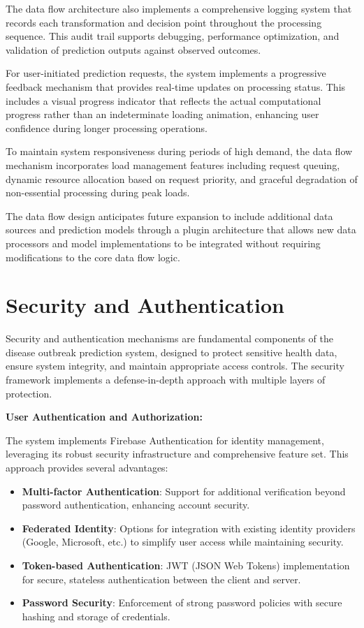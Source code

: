\documentclass[12pt,a4paper]{report}
\begin{document}
The data flow architecture also implements a comprehensive logging system that records each transformation and decision point throughout the processing sequence. This audit trail supports debugging, performance optimization, and validation of prediction outputs against observed outcomes.

For user-initiated prediction requests, the system implements a progressive feedback mechanism that provides real-time updates on processing status. This includes a visual progress indicator that reflects the actual computational progress rather than an indeterminate loading animation, enhancing user confidence during longer processing operations.

To maintain system responsiveness during periods of high demand, the data flow mechanism incorporates load management features including request queuing, dynamic resource allocation based on request priority, and graceful degradation of non-essential processing during peak loads.

The data flow design anticipates future expansion to include additional data sources and prediction models through a plugin architecture that allows new data processors and model implementations to be integrated without requiring modifications to the core data flow logic.

\section{Security and Authentication}
Security and authentication mechanisms are fundamental components of the disease outbreak prediction system, designed to protect sensitive health data, ensure system integrity, and maintain appropriate access controls. The security framework implements a defense-in-depth approach with multiple layers of protection.

\textbf{User Authentication and Authorization:}

The system implements Firebase Authentication for identity management, leveraging its robust security infrastructure and comprehensive feature set. This approach provides several advantages:

\begin{itemize}
    \item \textbf{Multi-factor Authentication}: Support for additional verification beyond password authentication, enhancing account security.
    \item \textbf{Federated Identity}: Options for integration with existing identity providers (Google, Microsoft, etc.) to simplify user access while maintaining security.
    \item \textbf{Token-based Authentication}: JWT (JSON Web Tokens) implementation for secure, stateless authentication between the client and server.
    \item \textbf{Password Security}: Enforcement of strong password policies with secure hashing and storage of credentials.
\end{itemize}
\end{document}
